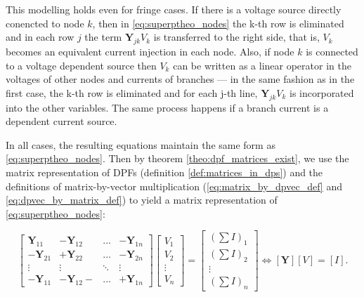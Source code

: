 	This modelling holds even for fringe cases. If there is a voltage source directly conencted to node $k$, then in \eqref{eq:superptheo_nodes} the k-th row is eliminated and in each row $j$ the term $\mathbf{Y}_{jk}V_k$ is transferred to the right side, that is, $V_k$ becomes an equivalent current injection in each node. Also, if node $k$ is connected to a voltage dependent source then $V_k$ can be written as a linear operator in the voltages of other nodes and currents of branches — in the same fashion as in the first case, the k-th row is eliminated and for each j-th line, $\mathbf{Y}_{jk}V_k$ is incorporated into the other variables. The same process happens if a branch current is a dependent current source.

	In all cases, the resulting equations maintain the same form as \eqref{eq:superptheo_nodes}. Then by theorem \ref{theo:dpf_matrices_exist}, we use the matrix representation of DPFs (definition \ref{def:matrices_in_dps}) and the definitions of matrix-by-vector multiplication (\eqref{eq:matrix_by_dpvec_def} and \eqref{eq:dpvec_by_matrix_def}) to yield a matrix representation of \eqref{eq:superptheo_nodes}:

\begin{equation}
	\left[\begin{array}{cccc} \mathbf{Y}_{11} & - \mathbf{Y}_{12} & ...  & - \mathbf{Y}_{1n} \\[3mm] - \mathbf{Y}_{21} & + \mathbf{Y}_{22} & ...  & - \mathbf{Y}_{2n} \\[3mm] \vdots & \vdots & \ddots & \vdots \\[3mm] - \mathbf{Y}_{11} & - \mathbf{Y}_{12} - & ...  & + \mathbf{Y}_{1n} \end{array}\right]\left[\begin{array}{c} V_1 \\[3mm] V_2 \\[3mm] \vdots \\[3mm] V_n\end{array}\right] = \left[\begin{array}{c} \displaystyle\left(\sum I\right)_1 \\[3mm]\displaystyle \left(\sum I\right)_2 \\[3mm] \vdots \\[3mm]\displaystyle \left(\sum I\right)_n \end{array}\right] \Leftrightarrow \left[\mathbf{Y}\right]\left[V\right] = \left[I\right] .\label{eq:superptheo_nodematrix}
\end{equation}

